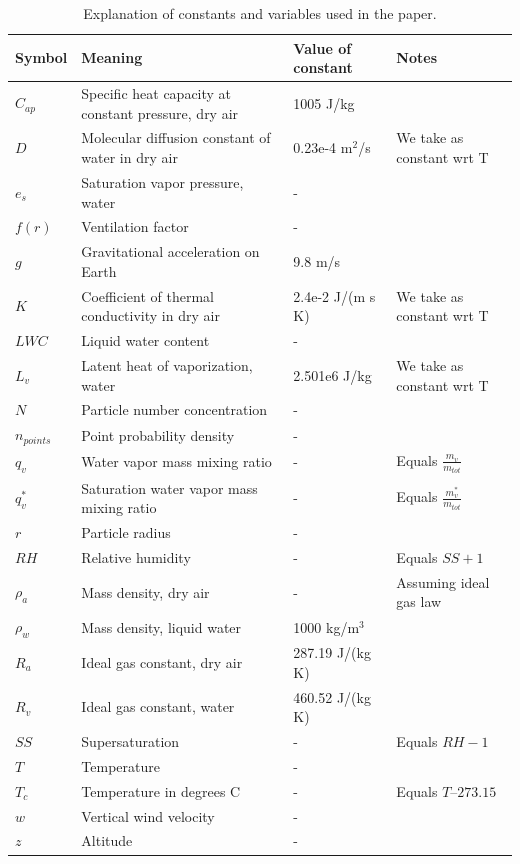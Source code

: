 \documentclass{article}
\begin{document}
\begin{table}
\centering
\begin{tabular}{@{}llll@{}}
\toprule
Symbol & Meaning & Value of constant & Notes \\ \midrule
$C_{ap}$ & Specific heat capacity at constant pressure, dry air & 1005 J/kg &  \\
$D$ & Molecular diffusion constant of water in dry air & 0.23e-4 m$^2$/s & We take as constant wrt T \\
$e_s$ & Saturation vapor pressure, water & - &  \\
$f(r)$ & Ventilation factor & - &  \\
$g$ & Gravitational acceleration on Earth & 9.8 m/s &  \\
$K$ & Coefficient of thermal conductivity in dry air & 2.4e-2 J/(m s K) & We take as constant wrt T \\
$LWC$ & Liquid water content & - &  \\
$L_v$ & Latent heat of vaporization, water & 2.501e6 J/kg & We take as constant wrt T \\
$N$ & Particle number concentration & - &  \\
$n_{points}$ & Point probability density & - &  \\
$q_v$ & Water vapor mass mixing ratio & - & Equals $\frac{m_v}{m_{tot}}$ \\
$q_v^*$ & Saturation water vapor mass mixing ratio & - & Equals $\frac{m_v^*}{m_{tot}}$ \\
$r$ & Particle radius & - &  \\
$RH$ & Relative humidity & - & Equals $SS+1$ \\
$\rho_a$ & Mass density, dry air & - & Assuming ideal gas law \\
$\rho_w$ & Mass density, liquid water & 1000 kg/m$^3$ &  \\
$R_a$ & Ideal gas constant, dry air & 287.19 J/(kg K) &  \\
$R_v$ & Ideal gas constant, water & 460.52 J/(kg K) &  \\
$SS$ & Supersaturation & - & Equals $RH-1$ \\
$T$ & Temperature & - &  \\
$T_c$ & Temperature in degrees C & - & Equals $T – 273.15$ \\
$w$ & Vertical wind velocity & - &  \\
$z$ & Altitude & - &  \\ \bottomrule
\end{tabular}
\caption{Explanation of constants and variables used in the paper.}
\label{vartable}
\end{table}

\clearpage
\newpage



\end{document}
